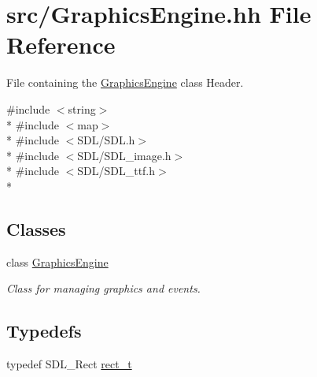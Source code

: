 \hypertarget{GraphicsEngine_8hh}{\section{src/\-Graphics\-Engine.hh File Reference}
\label{GraphicsEngine_8hh}
}


File containing the \hyperlink{classGraphicsEngine}{Graphics\-Engine} class Header.  


{\ttfamily \#include $<$string$>$}\\*
{\ttfamily \#include $<$map$>$}\\*
{\ttfamily \#include $<$S\-D\-L/\-S\-D\-L.\-h$>$}\\*
{\ttfamily \#include $<$S\-D\-L/\-S\-D\-L\-\_\-image.\-h$>$}\\*
{\ttfamily \#include $<$S\-D\-L/\-S\-D\-L\-\_\-ttf.\-h$>$}\\*
\subsection*{Classes}
\begin{DoxyCompactItemize}
\item 
class \hyperlink{classGraphicsEngine}{Graphics\-Engine}
\begin{DoxyCompactList}\small\item\em Class for managing graphics and events. \end{DoxyCompactList}\end{DoxyCompactItemize}
\subsection*{Typedefs}
\begin{DoxyCompactItemize}
\item 
typedef S\-D\-L\-\_\-\-Rect \hyperlink{GraphicsEngine_8hh_a9a150f1ad43ec7de65cfe698cdae8bee}{rect\-\_\-t}
\end{DoxyCompactItemize}
